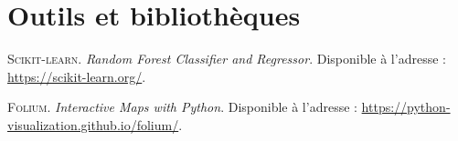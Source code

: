 \documentclass[12pt, a4paper]{report}
\begin{document}
\section*{Outils et bibliothèques}

\begin{enumerate}[label={[4]}, leftmargin=2cm, start=4]
\item \textsc{Scikit-learn}. \textit{Random Forest Classifier and Regressor}. Disponible à l'adresse : \url{https://scikit-learn.org/}.
\item \textsc{Folium}. \textit{Interactive Maps with Python}. Disponible à l'adresse : \url{https://python-visualization.github.io/folium/}.
\end{enumerate}

\endgroup
\end{document}
